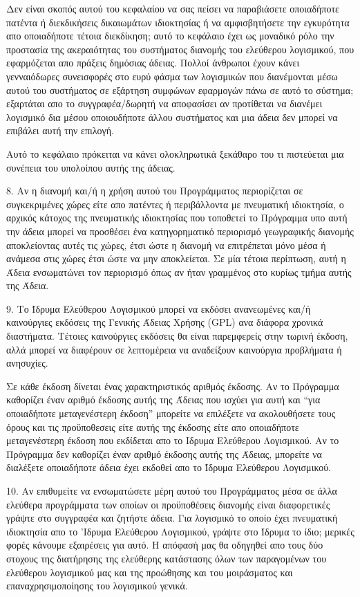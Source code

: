 \begin{small}
Δεν είναι σκοπός αυτού του κεφαλαίου να σας πείσει να παραβιάσετε οποιαδήποτε πατέντα ή διεκδικήσεις δικαιωμάτων ιδιοκτησίας ή να αμφισβητήσετε την εγκυρότητα απο οποιαδήποτε τέτοια διεκδίκηση; αυτό το κεφάλαιο έχει ως μοναδικό ρόλο την προστασία της ακεραιότητας του συστήματος διανομής του ελεύθερου λογισμικού, που εφαρμόζεται απο πράξεις δημόσιας άδειας. Πολλοί άνθρωποι έχουν κάνει γενναιόδωρες συνεισφορές στο ευρύ φάσμα των λογισμικών που διανέμονται μέσω αυτού του συστήματος σε εξάρτηση συμφώνων εφαρμογών πάνω σε αυτό το σύστημα; εξαρτάται απο το συγγραφέα/δωρητή να αποφασίσει αν προτίθεται να διανέμει λογισμικό δια μέσου οποιουδήποτε άλλου συστήματος και μια άδεια δεν μπορεί να επιβάλει αυτή την επιλογή.

Αυτό το κεφάλαιο πρόκειται να κάνει ολοκληρωτικά ξεκάθαρο του τι πιστεύεται μια συνέπεια του υπολοίπου αυτής της άδειας.

8. Αν η διανομή και/ή η χρήση αυτού του Προγράμματος περιορίζεται σε συγκεκριμένες χώρες είτε απο πατέντες ή περιβάλλοντα με πνευματική ιδιοκτησία, ο αρχικός κάτοχος της πνευματικής ιδιοκτησίας που τοποθετεί το Πρόγραμμα υπο αυτή την άδεια μπορεί να προσθέσει ένα κατηγορηματικό περιορισμό γεωγραφικής διανομής αποκλείοντας αυτές τις χώρες, έτσι ώστε η διανομή να επιτρέπεται μόνο μέσα ή ανάμεσα στις χώρες έτσι ώστε να μην αποκλείεται. Σε μία τέτοια περίπτωση, αυτή η Άδεια ενσωματώνει τον περιορισμό όπως αν ήταν γραμμένος στο κυρίως τμήμα αυτής της Άδεια.

9. Το Ίδρυμα Ελεύθερου Λογισμικού μπορεί να εκδόσει ανανεωμένες και/ή καινούργιες εκδόσεις της Γενικής Άδειας Χρήσης (GPL) ανα διάφορα χρονικά διαστήματα. Τέτοιες καινούργιες εκδόσεις θα είναι παρεμφερείς στην τωρινή έκδοση, αλλά μπορεί να διαφέρουν σε λεπτομέρεια να αναδείξουν καινούργια προβλήματα ή ανησυχίες.

Σε κάθε έκδοση δίνεται ένας χαρακτηριστικός αριθμός έκδοσης. Αν το Πρόγραμμα καθορίζει έναν αριθμό έκδοσης αυτής της Άδειας που ισχύει για αυτή και “για οποιαδήποτε μεταγενέστερη έκδοση” μπορείτε να επιλέξετε να ακολουθήσετε τους όρους και τις προϋποθεσεις είτε αυτής της έκδοσης είτε απο οποιαδήποτε μεταγενέστερη έκδοση που εκδίδεται απο το Ιδρυμα Ελεύθερου Λογισμικού. Αν το Πρόγραμμα δεν καθορίζει έναν αριθμό έκδοσης αυτής της Άδειας, μπορείτε να διαλέξετε οποιαδήποτε άδεια έχει εκδοθεί απο το Ίδρυμα Ελεύθερου Λογισμικού.

10. Αν επιθυμείτε να ενσωματώσετε μέρη αυτού του Προγράμματος μέσα σε άλλα ελεύθερα προγράμματα των οποίων οι προϋποθέσεις διανομής είναι διαφορετικές γράψτε στο συγγραφέα και ζητήστε άδεια. Για λογισμικό το οποίο έχει πνευματική ιδιοκτησία απο το 'Ιδρυμα Ελεύθερου Λογισμικού, γράψτε στο Ίδρυμα το ίδιο; μερικές φορές κάνουμε εξαιρέσεις για αυτό. Η απόφασή μας θα οδηγηθεί απο τους δύο στοχους της διατήρησης της ελεύθερης κατάστασης όλων των παραγομένων του ελεύθερου λογισμικού μας και της προώθησης και του μοιράσματος και επαναχρησιμοποίησης του λογισμικού γενικά.


\end{small}
